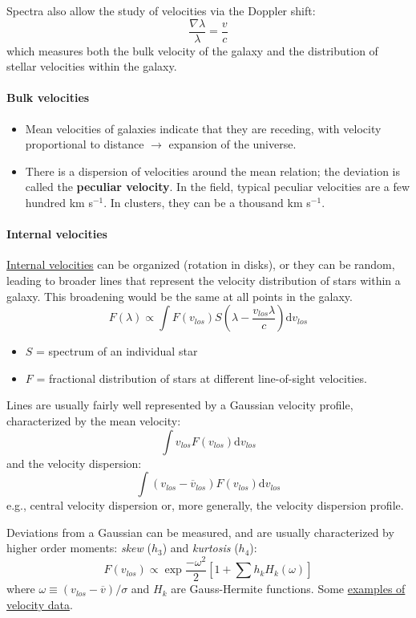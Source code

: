 \documentclass{article}
\newcommand{\mynotes}[1]{\textcolor{cadmiumgreen}{#1}}
\begin{document}
Spectra also allow the study of velocities via the Doppler shift:
\[
    \frac{\nabla\lambda}{\lambda} = \frac{v}{c}
    \]
which measures both the bulk velocity of the galaxy and the
distribution of stellar velocities within the galaxy.
\paragraph{Bulk velocities}
\begin{itemize}
    \item Mean velocities of galaxies indicate that they are receding, with
        velocity proportional to distance $\rightarrow$ expansion of the
        universe.
    \item There is a dispersion of velocities around the mean relation; the
        deviation is called the \textbf{peculiar velocity}.  In the field,
        typical peculiar velocities are a few hundred km s$^{-1}$.  In
        clusters, they can be a thousand km s$^{-1}$.
\end{itemize}
\paragraph{Internal velocities}
\href{http://astronomy.nmsu.edu/holtz/a555/resources/intvel.gif}
{Internal velocities} can be organized (rotation in disks), or they can
be random, leading to broader lines that represent the
velocity distribution of stars within a galaxy.
\mynotes{This broadening would be the same at all points in the galaxy.}
\[
    F(\lambda) \propto \int{F(v_{los})S\left(\lambda-\frac{v_{los}\lambda}{c}
    \right)\mathrm{d}v_{los} }
    \]

\begin{itemize}
    \item $S$ = spectrum of an individual star
    \item $F$ = fractional distribution of stars at
        different line-of-sight velocities.
\end{itemize}
Lines are usually fairly well represented
by a Gaussian velocity profile, characterized by the mean velocity:
\[
    \int{v_{los}F(v_{los})\mathrm{d}v_{los}}
    \]
and the velocity dispersion:
\[
    \int{(v_{los}-\overline{v}_{los})F(v_{los})\mathrm{d}v_{los}}
    \]
e.g., central velocity dispersion or, more generally, the velocity
dispersion profile.

Deviations from a Gaussian can be measured, and are usually characterized
by higher order moments: \textit{skew} ($h_{3}$) and \textit{kurtosis}
($h_{4}$):
\[
    F(v_{los}) \propto \exp\frac{-\omega^{2}}{2}\left[
        1 + \sum{h_{k}H_{k}(\omega)}\right]
\]
where $\omega \equiv (v_{los}-\overline{v})/\sigma$ and
$H_{k}$ are Gauss-Hermite functions.
Some
\href{http://astronomy.nmsu.edu/holtz/a555/resources/examplesh3h4.gif}
{examples of velocity data}.
\end{document}

